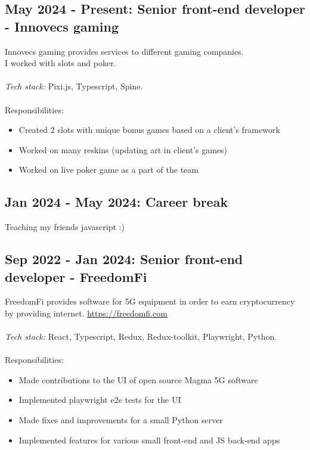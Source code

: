 \documentclass[a4paper, 14pt]{article}
\begin{document}
  \subsection{May 2024 - Present: Senior front-end developer - Innovecs gaming}
    Innovecs gaming provides services to different gaming companies. \\
    I worked with slots and poker. \\
    \\
    \textit{Tech stack:} Pixi.js, Typescript, Spine. \\
    \\
    Responsibilities:
      \begin{itemize}
        \item Created 2 slots with unique bonus games based on a client's framework \\
        \item Worked on many reskins (updating art in client's games) \\
        \item Worked on live poker game as a part of the team
      \end{itemize}

  \subsection{Jan 2024 - May 2024: Career break}
    Teaching my friends javascript :)

  \subsection{Sep 2022 - Jan 2024: Senior front-end developer - FreedomFi}

  FreedomFi provides software for 5G equipment in order to earn cryptocurrency by providing internet. \url{https://freedomfi.com} \\
  \\
  \textit{Tech stack:} React, Typescript, Redux, Redux-toolkit, Playwright, Python. \\
  \\
  Responsibilities:
    \begin{itemize}
      \item Made contributions to the UI of open source Magma 5G software \\
      \item Implemented playwright e2e tests for the UI \\
      \item Made fixes and improvements for a small Python server \\
      \item Implemented features for various small front-end and JS back-end apps
    \end{itemize}
\end{document}
